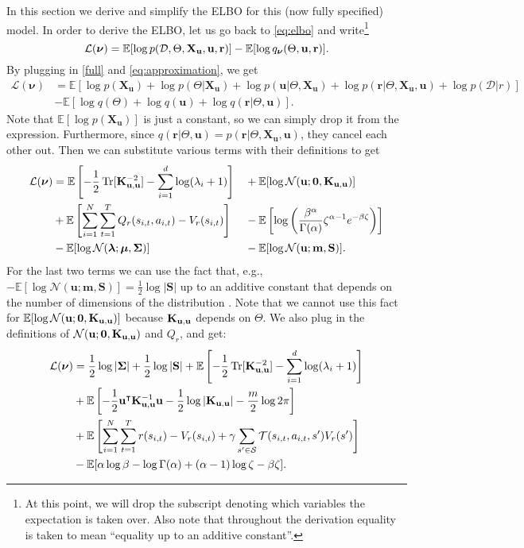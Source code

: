 \documentclass{mprop}
\theoremstyle{definition}
\DeclareMathOperator{\Tr}{Tr}
\begin{document}
In this section we derive and simplify the ELBO for this (now fully specified)
model. In order to derive the ELBO, let us go back to \eqref{eq:elbo} and
write\footnote{At this point, we will drop the subscript denoting which
  variables the expectation is taken over. Also note that throughout the derivation
  equality is taken to mean ``equality up to an additive constant''.}
\[ \mathcal{L}(\bm\nu) = \mathbb{E}[\log p(\mathcal{D}, \Theta, \mathbf{X_u}, \mathbf{u}, \mathbf{r})] -
  \mathbb{E}[\log q_{\bm\nu}(\Theta, \mathbf{u}, \mathbf{r})]. \]
By plugging in \eqref{full} and \eqref{eq:approximation}, we get
\[
  \begin{split}
    \mathcal{L}(\bm\nu) &= \mathbb{E}[\log p(\mathbf{X_u}) + \log p(\Theta |
    \mathbf{X_u}) + \log p(\mathbf{u} | \Theta, \mathbf{X_u}) + \log
    p(\mathbf{r} | \Theta, \mathbf{X_u}, \mathbf{u}) + \log p(\mathcal{D} | r)] \\
    &- \mathbb{E}[\log q(\Theta) + \log q(\mathbf{u}) + \log q(\mathbf{r} |
    \Theta, \mathbf{u})].
  \end{split}
\]
Note that $\mathbb{E}[\log p(\mathbf{X_u})]$ is just a constant, so we can
simply drop it from the expression. Furthermore, since $q(\mathbf{r} | \Theta,
\mathbf{u}) = p(\mathbf{r} | \Theta, \mathbf{X_u}, \mathbf{u})$, they cancel
each other out. Then we can substitute various terms with their definitions to
get
\begin{alignat*}{3}
  \mathcal{L}(\bm\nu) &= \mathbb{E}\left[-\frac{1}{2}\Tr[\Kuu^{-2}] -
    \sum_{i=1}^d \log(\lambda_i + 1)\right] &&+ \mathbb{E}[\log
  \mathcal{N}(\mathbf{u}; \mathbf{0}, \Kuu)] \\
  &+ \mathbb{E}\left[ \sum_{i=1}^N \sum_{t=1}^T Q_r(s_{i,t}, a_{i,t}) -
    V_r(s_{i,t}) \right] &&-
  \mathbb{E}\left[\log\left(\frac{\beta^\alpha}{\Gamma(\alpha)}\zeta^{\alpha -
        1}e^{-\beta\zeta}\right)\right] \\
  &- \mathbb{E}[\log\mathcal{N}(\bm\lambda; \bm\mu, \bm\Sigma)] &&-
  \mathbb{E}[\log\mathcal{N}(\mathbf{u}; \mathbf{m}, \mathbf{S})].
\end{alignat*}
For the last two terms we can use the fact that, e.g., $-\mathbb{E}[\log
\mathcal{N}(\mathbf{u}; \mathbf{m}, \mathbf{S})] = \frac{1}{2}\log|\mathbf{S}|$
up to an additive constant that depends on the number of dimensions of the
distribution \cite{DBLP:journals/tit/AhmedG89}. Note that we cannot use this
fact for $\mathbb{E}[\log \mathcal{N}(\mathbf{u}; \mathbf{0}, \mathbf{K}_{\mathbf{u},\mathbf{u}})]$  because
$\mathbf{K}_{\mathbf{u},\mathbf{u}}$ depends on $\Theta$. We also plug in the definitions of
$\mathcal{N}(\mathbf{u}; \mathbf{0}, \mathbf{K}_{\mathbf{u},\mathbf{u}})$ and $Q_r$, and get:
\begin{align*}
  \mathcal{L}(\bm\nu) &= \frac{1}{2}\log|\bm\Sigma| + \frac{1}{2}\log|\mathbf{S}| + \mathbb{E}\left[-\frac{1}{2}\Tr[\Kuu^{-2}] -
    \sum_{i=1}^d \log(\lambda_i + 1)\right] \\
  &+ \mathbb{E}\left[-\frac{1}{2}\mathbf{u}^\intercal\Kuu^{-1}\mathbf{u} -
    \frac{1}{2}\log|\Kuu| - \frac{m}{2}\log 2\pi\right] \\
  &+ \mathbb{E}\left[\sum_{i=1}^N \sum_{t=1}^T r(s_{i,t}) - V_r(s_{i,t}) + \gamma\sum_{s' \in \mathcal{S}}
    \mathcal{T}(s_{i,t}, a_{i,t}, s')V_r(s') \right] \\
  &- \mathbb{E}[\alpha\log\beta - \log\Gamma(\alpha) + (\alpha - 1)\log\zeta - \beta\zeta].
\end{align*}
\end{document}
